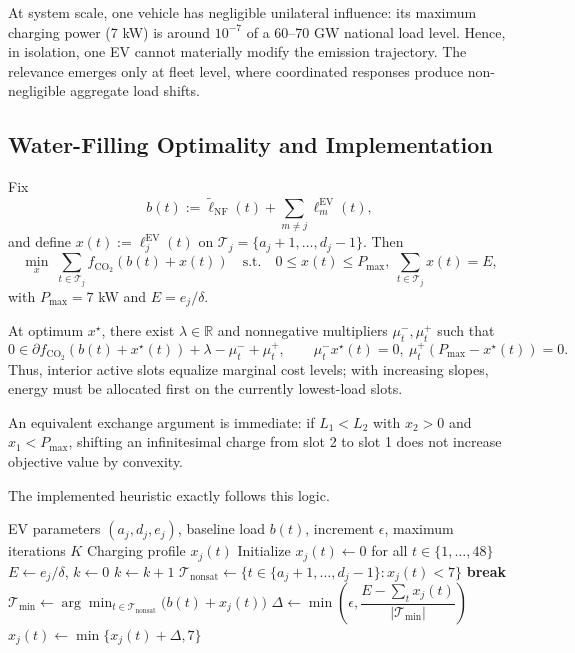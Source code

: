 \documentclass[11pt]{article}
\begin{document}
At system scale, one vehicle has negligible unilateral influence: its maximum charging power (7 kW) is around $10^{-7}$ of a 60--70 GW national load level. Hence, in isolation, one EV cannot materially modify the emission trajectory. The relevance emerges only at fleet level, where coordinated responses produce non-negligible aggregate load shifts.

\subsection{Water-Filling Optimality and Implementation}
\label{subsec:water_filling}

Fix
\[
b(t):=\tilde \ell_{\mathrm{NF}}(t)+\sum_{m\neq j}\ell^{\mathrm{EV}}_m(t),
\]
and define $x(t):=\ell^{\mathrm{EV}}_j(t)$ on $\mathcal T_j=\{a_j+1,\dots,d_j-1\}$. Then
\begin{equation}
\label{eq:Pj_simplified}
\min_{x}\; \sum_{t\in\mathcal T_j} f_{\mathrm{CO}_2}(b(t)+x(t))
\quad\text{s.t.}\quad
0\le x(t)\le P_{\max},\ \sum_{t\in\mathcal T_j}x(t)=E,
\end{equation}
with $P_{\max}=7$ kW and $E=e_j/\delta$.

At optimum $x^\star$, there exist $\lambda\in\mathbb R$ and nonnegative multipliers $\mu_t^-,\mu_t^+$ such that
\begin{equation}
\label{eq:KKT_subgrad}
0\in \partial f_{\mathrm{CO}_2}(b(t)+x^\star(t)) + \lambda - \mu_t^- + \mu_t^+,
\qquad
\mu_t^-x^\star(t)=0,
\ \mu_t^+(P_{\max}-x^\star(t))=0.
\end{equation}
Thus, interior active slots equalize marginal cost levels; with increasing slopes, energy must be allocated first on the currently lowest-load slots.

An equivalent exchange argument is immediate: if $L_1<L_2$ with $x_2>0$ and $x_1<P_{\max}$, shifting an infinitesimal charge from slot 2 to slot 1 does not increase objective value by convexity.

The implemented heuristic exactly follows this logic.

\begin{algorithm}[H]
\caption{Water-Filling Best Response for One EV}
\label{alg:water_filling}
\begin{algorithmic}[1]
\Require EV parameters $(a_j,d_j,e_j)$, baseline load $b(t)$, increment $\epsilon$, maximum iterations $K$
\Ensure Charging profile $x_j(t)$
\State Initialize $x_j(t)\gets 0$ for all $t\in\{1,\dots,48\}$
\State $E\gets e_j/\delta$, $k\gets 0$
    \State $k\gets k+1$
    \State $\mathcal T_{\mathrm{nonsat}}\gets\{t\in\{a_j+1,\dots,d_j-1\}: x_j(t)<7\}$
        \State \textbf{break}
    \EndIf
    \State $\mathcal T_{\min}\gets\arg\min_{t\in\mathcal T_{\mathrm{nonsat}}}\big(b(t)+x_j(t)\big)$
    \State $\Delta\gets \min\!\left(\epsilon,\dfrac{E-\sum_t x_j(t)}{|\mathcal T_{\min}|}\right)$
        \State $x_j(t)\gets\min\{x_j(t)+\Delta,7\}$
    \EndFor
\EndWhile
\end{algorithmic}
\end{algorithm}
\end{document}
